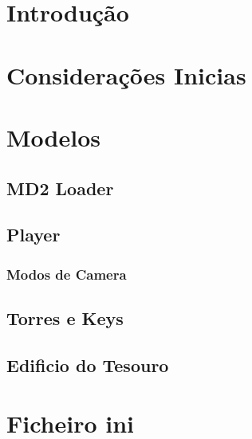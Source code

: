 \documentclass[12pt,a4paper,portuges]{style/myreport}
\begin{document}
\newpage




\chapter{Introdução}


\newpage

\chapter{Considerações Inicias}


\newpage


\chapter{Modelos}


\newpage

\section{MD2 Loader}


\newpage

\section{Player}

\subsection{Modos de Camera}


\newpage

\section{Torres e Keys}


\section{Edificio do Tesouro}


\newpage


\chapter{Ficheiro ini}

\end{document}

